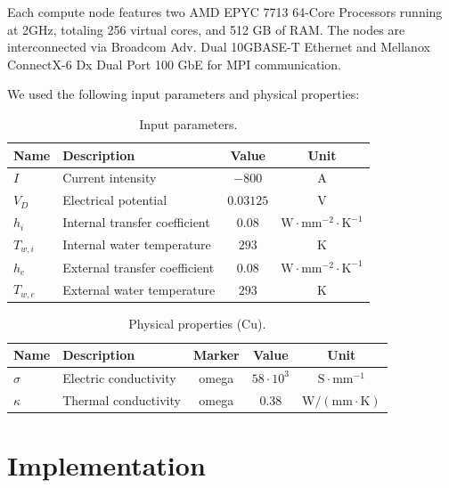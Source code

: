 \documentclass[12pt]{article}
\begin{document}
\noindent Each compute node features two AMD EPYC 7713 64-Core Processors running at 2GHz, 
totaling 256 virtual cores, and 512 GB of RAM. The nodes are interconnected via 
Broadcom Adv. Dual 10GBASE-T Ethernet and Mellanox ConnectX-6 Dx Dual Port 100 
GbE for MPI communication.

We used the following input parameters and physical properties:

\begin{table}[H]
	\centering
	\begin{tabular}{|l|l|c|c|}
	\hline
	\textbf{Name} & \textbf{Description} & \textbf{Value} & \textbf{Unit} \\ \hline
	$I$ & Current intensity & $-800$ & A \\ \hline
	$V_D$ & Electrical potential & $0.03125$ & V \\ \hline
	$h_i$ & Internal transfer coefficient & $0.08$ & $\mathrm{W \cdot mm^{-2} \cdot K^{-1}}$ \\ \hline
	$T_{w,i}$ & Internal water temperature & $293$ & K \\ \hline
	$h_e$ & External transfer coefficient & $0.08$ & $\mathrm{W \cdot mm^{-2} \cdot K^{-1}}$ \\ \hline
	$T_{w,e}$ & External water temperature & $293$ & K \\ \hline
	\end{tabular}
	\caption{Input parameters.}
	\label{tab:input_parameters}
	\end{table}

	\begin{table}[H]
		\centering
		\begin{tabular}{|l|l|c|c|c|}
		\hline
		\textbf{Name} & \textbf{Description} & \textbf{Marker} & \textbf{Value} & \textbf{Unit} \\ \hline
		$\sigma$ & Electric conductivity & omega & $58 \cdot 10^3$ & $\mathrm{S \cdot mm^{-1}}$ \\ \hline
		$\kappa$ & Thermal conductivity & omega & $0.38$ & $\mathrm{W/(mm \cdot K)}$ \\ \hline
		\end{tabular}
		\caption{Physical properties (Cu).}
		\label{tab:physical_properties}
	\end{table}


			

\section{Implementation}
\end{document}
